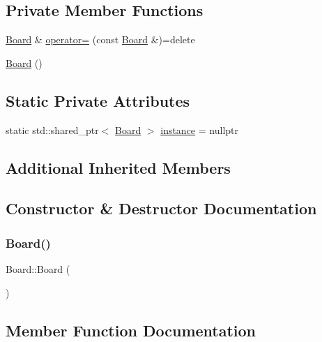 \subsection*{Private Member Functions}
\begin{DoxyCompactItemize}
\item 
\hyperlink{class_board}{Board} \& \hyperlink{class_board_a892306c4b944bfe904b297092763084a}{operator=} (const \hyperlink{class_board}{Board} \&)=delete
\item 
\hyperlink{class_board_a9ee491d4fea680cf69b033374a9fdfcb}{Board} ()
\end{DoxyCompactItemize}
\subsection*{Static Private Attributes}
\begin{DoxyCompactItemize}
\item 
static std\+::shared\+\_\+ptr$<$ \hyperlink{class_board}{Board} $>$ \hyperlink{class_board_a5014ff09a45a8e954b8245357b1544ea}{instance} = nullptr
\end{DoxyCompactItemize}
\subsection*{Additional Inherited Members}


\subsection{Constructor \& Destructor Documentation}
\mbox{\label{class_board_a9ee491d4fea680cf69b033374a9fdfcb}} 
\subsubsection{\texorpdfstring{Board()}{Board()}}
{\footnotesize\ttfamily Board\+::\+Board (\begin{DoxyParamCaption}{ }\end{DoxyParamCaption})\hspace{0.3cm}{\ttfamily [private]}}



\subsection{Member Function Documentation}
\mbox{\label{class_board_ad42eee5655e76255fac9d91eee5d8c64}} 

